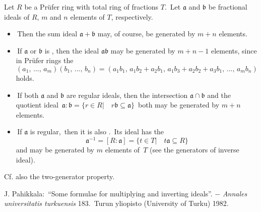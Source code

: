\documentclass[12pt]{article}
\begin{document}
Let $R$ be a Pr\"ufer ring with total ring of fractions $T$.
\,Let $\mathfrak{a}$ and $\mathfrak{b}$ be fractional ideals of $R$,  $m$ and $n$ elements of $T$, respectively. 
\begin{itemize}
 \item\,Then the  sum ideal  $\mathfrak{a+b}$ may, of course, be generated by $m+n$ elements. 
 \item\,If $\mathfrak{a}$ or $\mathfrak{b}$ is , then the    ideal $\mathfrak{ab}$ may be generated by $m+n-1$ elements, since in Pr\"ufer rings the 
$$(a_1, \,...,\,a_m)(b_1,\,...,\,b_n) =
  (a_1b_1,\,a_1b_2+a_2b_1,\,a_1b_3+a_2b_2+a_3b_1,\, ...,\,a_mb_n)$$
holds.
 \item\,If both $\mathfrak{a}$ and $\mathfrak{b}$ are regular ideals, then the intersection $\mathfrak{a}\cap\mathfrak{b}$ and the quotient ideal \,$\mathfrak{a\colon\!b} = \{r \in R| \quad r\mathfrak{b} \subseteq \mathfrak{a}\}$ \,both may be generated by $m+n$ elements.
 \item\,If $\mathfrak{a}$ is regular, \,then it is also .\, Its  ideal has the 
$$\mathfrak{a}^{-1} = [R:\mathfrak{a}] = \{t\in T|\quad t\mathfrak{a} \subseteq R\}$$
and may be generated by $m$ elements of \,$T$ (see the generators of inverse ideal).
\end{itemize}

Cf. also the two-generator property.

\begin{thebibliography}{9}
J. Pahikkala: \,``Some formulae for multiplying and inverting ideals''. $-$ \emph{Annales universitatis turkuensis} 183. \,Turun yliopisto (University of Turku) 1982.
\end{thebibliography}
\end{document}

